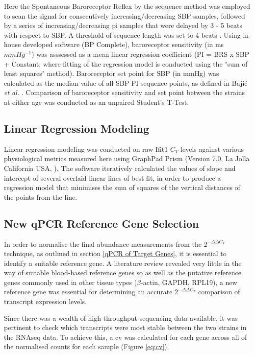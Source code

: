 Here the Spontaneous Baroreceptor Reflex by the sequence method was employed to scan the signal for consecutively increasing/decreasing SBP samples, followed by a series of increasing/decreasing \acrfull{pi} samples that were delayed by 3 - 5 beats with respect to SBP. A threshold of sequence length was set to 4 beats \cite{Mussalo2002}. Using in-house developed software (BP Complete), baroreceptor sensitivity (in ms $mmHg^{-1}$) was asssessed as a mean linear regression coefficient (PI = BRS x SBP + Constant; where fitting of the regression model is conducted using the "sum of least squares" method). Baroreceptor set point for SBP (in mmHg) was calculated as the median value of all SBP-PI sequence points, as defined in Bajić \textit{et al.} \cite{Bajic2010}. Comparison of baroreceptor sensitivity and set point between the strains at either age was conducted as an unpaired Student's T-Test.

\subsection{Linear Regression Modeling}

Linear regression modeling was conducted on raw Ifit1 $C_{T}$ levels against various physiological metrics measured here using GraphPad Prism (Version 7.0, La Jolla California USA, \cite{graphpad}). The software iteratively calculated the values of slope and intercept of several overlaid linear lines of best fit, in order to produce a regression model that minimises the sum of squares of the vertical distances of the points from the line. 

\subsection{New qPCR Reference Gene Selection} \label{New qPCR Reference Gene Selection}

In order to normalise the final abundance measurements from the $2^{-\Delta\Delta C_{T}}$ technique, as outlined in section \ref{qPCR of Target Genes}, it is essential to identify a suitable reference gene. A literature review revealed very little in the way of suitable blood-based reference genes so as well as the putative reference genes commonly used in other tissue types ($\beta$-actin, GAPDH, RPL19), a new reference gene was essential for determining an accurate $2^{-\Delta\Delta C_{T}}$ comparison of transcript expression levels. 

Since there was a wealth of high throughput sequencing data available, it was pertinent to check which transcripts were most stable between the two strains in the RNAseq data. To achieve this, a \acrfull{cv} was calculated for each gene across all of the normalised counts for each sample (Figure \ref{eq:cv}). 

